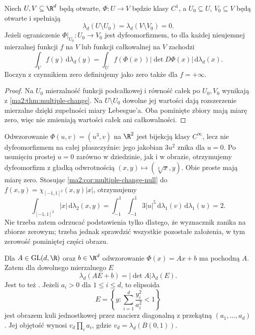 \begin{wniosek}
\label{ma2:cor:multiple-change-null}
Niech $U,V\subseteq\R^d$ będą otwarte,
$\Phi:U\to V$ będzie klasy $C^1$, a
$U_0\subseteq U$, $V_0\subseteq V$ będą otwarte
i spełniają
\[
 \lambda_d(U\setminus U_0)=
 \lambda_d(V\setminus V_0)=0.
\]
Jeżeli ograniczenie $\Phi|_{U_0}:U_0\to V_0$
jest dyfeomorfizmem, to dla każdej nieujemnej
mierzalnej funkcji $f$ na $V$ lub funkcji
całkowalnej na $V$ zachodzi
\[
 \int_V f(y)\,\mathrm d\lambda_d(y)
 =\int_U f(\Phi(x))|\det D\Phi(x)|\,
 \mathrm d\lambda_d(x).
\]
Iloczyn z czynnikiem zero definiujemy jako zero
także dla $f=+\infty$.
\end{wniosek}
\begin{proof}
Na $U_0$ mierzalność funkcji podcałkowej
i równość całek po $U_0,V_0$ wynikają z
\ref{ma2:thm:multiple-change}. Na $U\setminus U_0$
dowolne jej wartości dają rozszerzenie mierzalne
dzięki zupełności miary Lebesgue'a.
Oba pominięte zbiory mają miarę zero,
więc nie zmieniają wartości całek ani
całkowalności.
\end{proof}

\begin{przyklad}
\label{ma2:ex:multiple-zero-jacobian}
Odwzorowanie $\Phi(u,v)=(u^3,v)$ na $\R^2$
jest bijekcją klasy $C^\infty$, lecz nie
dyfeomorfizmem na całej płaszczyźnie:
jego jakobian $3u^2$ znika dla $u=0$.
Po usunięciu prostej $u=0$ zarówno w dziedzinie,
jak i w obrazie, otrzymujemy dyfeomorfizm
z gładką odwrotnością $(x,y)\mapsto(\sqrt[3]{x},y)$.
Obie proste mają miarę zero. Stosując
\ref{ma2:cor:multiple-change-null} do
$f(x,y)=\chi_{[-1,1]^2}(x,y)|x|$,
otrzymujemy
\[
 \int_{[-1,1]^2}|x|\,\mathrm d\lambda_2(x,y)
 =\int_{-1}^1\int_{-1}^1 3|u|^5\,
 \mathrm d\lambda_1(v)\,\mathrm d\lambda_1(u)=2.
\]
Nie trzeba zatem odrzucać podstawienia tylko
dlatego, że wyznacznik zanika na zbiorze zerowym;
trzeba jednak sprawdzić wszystkie pozostałe
założenia, w tym zerowość pominiętej części obrazu.
\end{przyklad}

\begin{przyklad}
\label{ma2:ex:multiple-affine}
Dla $A\in\mathrm{GL}(d,\R)$ oraz $b\in\R^d$
odwzorowanie $\Phi(x)=Ax+b$ ma pochodną $A$.
Zatem dla dowolnego mierzalnego $E$
\[
 \lambda_d(AE+b)=|\det A|\lambda_d(E).
\]
Jest to też
.
Jeżeli $a_i>0$ dla $1\le i\le d$, to elipsoida
\[
 E=\left\{y:\sum_{i=1}^d\frac{y_i^2}{a_i^2}<1\right\}
\]
jest obrazem kuli jednostkowej przez macierz
diagonalną z przekątną $(a_1,\ldots,a_d)$.
Jej objętość wynosi $v_d\prod_i a_i$,
gdzie $v_d=\lambda_d(B(0,1))$.
\end{przyklad}

